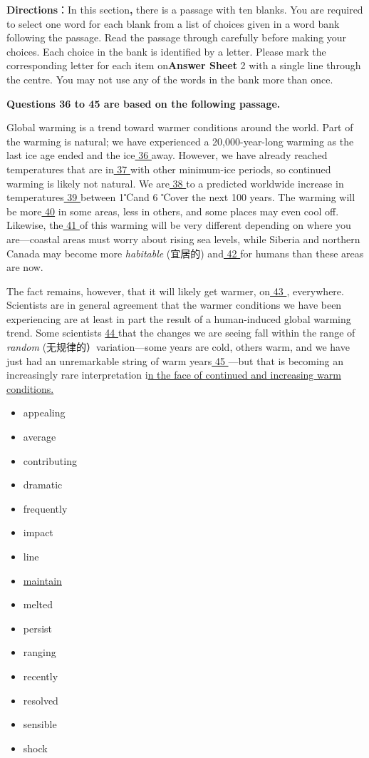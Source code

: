 \documentclass[UTF8,11pt]{ctexart}
\begin{document}
\textbf{Directions}：In this section\textbf{,} there is a passage with ten blanks. You are required to select one word for each blank from a list of choices given in a word bank following the passage. Read the passage through carefully before making your choices. Each choice in the bank is identified by a letter. Please mark the corresponding letter for each item on\textbf{Answer Sheet} 2 with a single line through the centre. You may not use any of the words in the bank more than once.


\textbf{Questions 36 to 45 are based on the following passage.}


Global warming is a trend toward warmer conditions around the world. Part of the warming is natural; we have experienced a 20,000-year-long warming as the last ice age ended and the ice\uline{ 36 }away. However, we have already reached temperatures that are in\uline{ 37 }with other minimum-ice periods, so continued warming is likely not natural. We are\uline{ 38 }to a predicted worldwide increase in temperatures\uline{ 39 }between 1℃and 6 ℃over the next 100 years. The warming will be more\uline{ 40} in some areas, less in others, and some places may even cool off. Likewise, the\uline{ 41 }of this warming will be very different depending on where you are—coastal areas must worry about rising sea levels, while Siberia and northern Canada may become more\textit{ habitable} (宜居的) and\uline{ 42 }for humans than these areas are now.


The fact remains, however, that it will likely get warmer, on\uline{ 43 }, everywhere. Scientists are in general agreement that the warmer conditions we have been experiencing are at least in part the result of a human-induced global warming trend. Some scientists \uline{44 }that the changes we are seeing fall within the range of\textit{ random} (无规律的）variation—some years are cold, others warm, and we have just had an unremarkable string of warm years\uline{ 45 }—but that is becoming an increasingly rare interpretation i\uline{n the face of continued and increasing warm conditions.}


\begin{itemize}[leftmargin=2em,itemsep=.2em,topsep=.4em]\item[A.] appealing
\item[B.] average
\item[C.] contributing
\item[D.] dramatic
\item[E.] frequently
\item[F.] impact
\item[G.] line
\item[H.] \uline{maintain}
\item[I.] melted
\item[J.] persist
\item[K.] ranging
\item[L.] recently
\item[M.] resolved
\item[N.] sensible
\item[O.] shock
\end{itemize}
\end{document}
